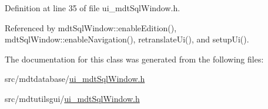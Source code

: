 Definition at line 35 of file ui\-\_\-mdt\-Sql\-Window.\-h.



Referenced by mdt\-Sql\-Window\-::enable\-Edition(), mdt\-Sql\-Window\-::enable\-Navigation(), retranslate\-Ui(), and setup\-Ui().



The documentation for this class was generated from the following files\-:\begin{DoxyCompactItemize}
\item 
src/mdtdatabase/\hyperlink{mdtdatabase_2ui__mdt_sql_window_8h}{ui\-\_\-mdt\-Sql\-Window.\-h}\item 
src/mdtutilsgui/\hyperlink{mdtutilsgui_2ui__mdt_sql_window_8h}{ui\-\_\-mdt\-Sql\-Window.\-h}\end{DoxyCompactItemize}
